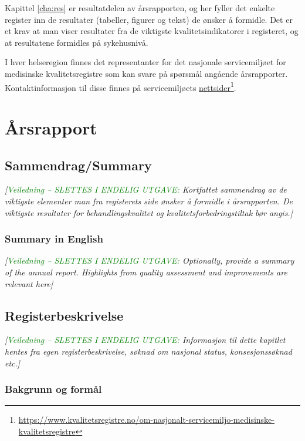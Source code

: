 \documentclass[norsk, a4paper, twocolumn]{report}
\newcommand{\newtext}[1]{\cbstart\textcolor{green}{#1\cbend}}
\newcommand{\guide}[1] {
	\textit{[\textcolor{guidegray}{\newtext{Veiledning -- SLETTES I ENDELIG
	UTGAVE:} #1}]}
	}
\begin{document}
Kapittel \ref{cha:res} er resultatdelen av årsrapporten, og her fyller det
enkelte register inn de resultater (tabeller, figurer og tekst) de ønsker å
formidle. Det er et krav at man viser resultater fra de viktigste
kvalitetsindikatorer i registeret, og at resultatene formidles på
sykehusnivå.

I hver helseregion finnes det representanter for det nasjonale
servicemiljøet for medisinske kvalitetsregistre som kan svare på spørsmål
angående årsrapporter. Kontaktinformasjon til disse finnes på
servicemiljøets \href{https://www.kvalitetsregistre.no/om-nasjonalt-servicemiljo-medisinske-kvalitetsregistre}{nettsider}\footnote{\url{https://www.kvalitetsregistre.no/om-nasjonalt-servicemiljo-medisinske-kvalitetsregistre}}.




\tableofcontents




\part{Årsrapport}\label{par:rap}
\thispagestyle{empty}
\twocolumn



\chapter{Sammendrag/Summary}
\guide{Kortfattet sammendrag av de viktigste elementer man fra registerets side
ønsker å formidle i årsrapporten. De viktigste resultater for
behandlingskvalitet og kvalitetsforbedringstiltak bør angis.}

\section*{Summary in English}
\guide{Optionally, provide a summary of the annual report. Highlights from
quality assessment and improvements are relevant here}


\chapter{Registerbeskrivelse}\label{cha:reg}
\guide{Informasjon til dette kapitlet hentes fra egen registerbeskrivelse,
søknad om nasjonal status, konsesjonssøknad etc.}

\section{Bakgrunn og formål}
\end{document}
